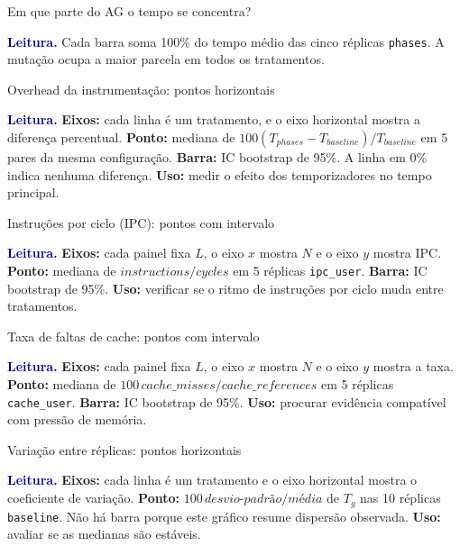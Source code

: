 \documentclass[aspectratio=169,11pt]{beamer}
\newcommand{\chartimage}[2][]{%
    \begin{center}\end{center}%
}
\newcommand{\chartcaption}[1]{%
    \vspace{-0.16cm}\par\footnotesize\textcolor{darkblue}{\textbf{Leitura.}} #1\par%
}
\begin{document}
\begin{frame}{Em que parte do AG o tempo se concentra?}
    \chartimage{../figures/composicao-fases}
    \chartcaption{Cada barra soma 100\% do tempo médio das cinco réplicas \texttt{phases}. A mutação
    ocupa a maior parcela em todos os tratamentos.}
\end{frame}

\begin{frame}{Overhead da instrumentação: pontos horizontais}
    \chartimage{../figures/overhead-fases}
    \chartcaption{\textbf{Eixos:} cada linha é um tratamento, e o eixo horizontal mostra a diferença percentual.
    \textbf{Ponto:} mediana de $100(T_{phases}-T_{baseline})/T_{baseline}$ em 5 pares da mesma configuração.
    \textbf{Barra:} IC bootstrap de 95\%. A linha em 0\% indica nenhuma diferença. \textbf{Uso:} medir o efeito
    dos temporizadores no tempo principal.}
\end{frame}

\begin{frame}{Instruções por ciclo (IPC): pontos com intervalo}
    \chartimage{../figures/ipc-workset}
    \chartcaption{\textbf{Eixos:} cada painel fixa $L$, o eixo $x$ mostra $N$ e o eixo $y$ mostra IPC.
    \textbf{Ponto:} mediana de $instructions/cycles$ em 5 réplicas \texttt{ipc\_user}. \textbf{Barra:}
    IC bootstrap de 95\%. \textbf{Uso:} verificar se o ritmo de instruções por ciclo muda entre tratamentos.}
\end{frame}

\begin{frame}{Taxa de faltas de cache: pontos com intervalo}
    \chartimage{../figures/cache-miss-workset}
    \chartcaption{\textbf{Eixos:} cada painel fixa $L$, o eixo $x$ mostra $N$ e o eixo $y$ mostra a taxa.
    \textbf{Ponto:} mediana de $100\,cache\_misses/cache\_references$ em 5 réplicas \texttt{cache\_user}.
    \textbf{Barra:} IC bootstrap de 95\%. \textbf{Uso:} procurar evidência compatível com pressão de memória.}
\end{frame}

\begin{frame}{Variação entre réplicas: pontos horizontais}
    \chartimage{../figures/variabilidade-baseline}
    \chartcaption{\textbf{Eixos:} cada linha é um tratamento e o eixo horizontal mostra o coeficiente de
    variação. \textbf{Ponto:} $100\,desvio\text{-}padrão/média$ de $T_g$ nas 10 réplicas \texttt{baseline}.
    Não há barra porque este gráfico resume dispersão observada. \textbf{Uso:} avaliar se as medianas são estáveis.}
\end{frame}
\end{document}
